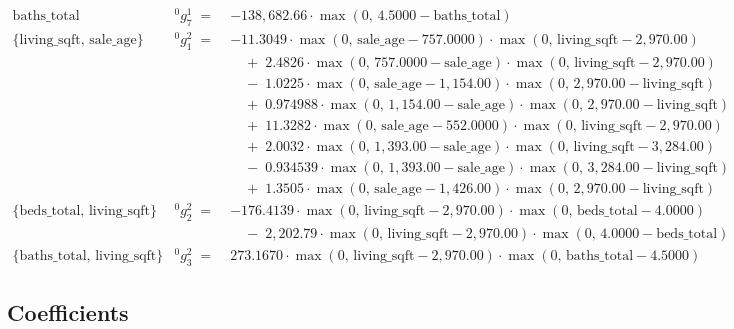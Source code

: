 \documentclass[
]{article}
\begin{document}
\[\begin{array}{lrl}
  \text{baths\_total} & {}^{0}g^{1}_{7} \;=\; & -138,682.66 \cdot \max(0,\, 4.5000 - \text{baths\_total}) \\
  \{\text{living\_sqft},\, \text{sale\_age}\} & {}^{0}g^{2}_{1} \;=\; & -11.3049 \cdot \max(0,\, \text{sale\_age} - 757.0000) \cdot \max(0,\, \text{living\_sqft} - 2,970.00) \\
  & & \quad + \; 2.4826 \cdot \max(0,\, 757.0000 - \text{sale\_age}) \cdot \max(0,\, \text{living\_sqft} - 2,970.00) \\
  & & \quad - \; 1.0225 \cdot \max(0,\, \text{sale\_age} - 1,154.00) \cdot \max(0,\, 2,970.00 - \text{living\_sqft}) \\
  & & \quad + \; 0.974988 \cdot \max(0,\, 1,154.00 - \text{sale\_age}) \cdot \max(0,\, 2,970.00 - \text{living\_sqft}) \\
  & & \quad + \; 11.3282 \cdot \max(0,\, \text{sale\_age} - 552.0000) \cdot \max(0,\, \text{living\_sqft} - 2,970.00) \\
  & & \quad + \; 2.0032 \cdot \max(0,\, 1,393.00 - \text{sale\_age}) \cdot \max(0,\, \text{living\_sqft} - 3,284.00) \\
  & & \quad - \; 0.934539 \cdot \max(0,\, 1,393.00 - \text{sale\_age}) \cdot \max(0,\, 3,284.00 - \text{living\_sqft}) \\
  & & \quad + \; 1.3505 \cdot \max(0,\, \text{sale\_age} - 1,426.00) \cdot \max(0,\, 2,970.00 - \text{living\_sqft}) \\
  \{\text{beds\_total},\, \text{living\_sqft}\} & {}^{0}g^{2}_{2} \;=\; & -176.4139 \cdot \max(0,\, \text{living\_sqft} - 2,970.00) \cdot \max(0,\, \text{beds\_total} - 4.0000) \\
  & & \quad - \; 2,202.79 \cdot \max(0,\, \text{living\_sqft} - 2,970.00) \cdot \max(0,\, 4.0000 - \text{beds\_total}) \\
  \{\text{baths\_total},\, \text{living\_sqft}\} & {}^{0}g^{2}_{3} \;=\; & 273.1670 \cdot \max(0,\, \text{living\_sqft} - 2,970.00) \cdot \max(0,\, \text{baths\_total} - 4.5000)
\end{array} 
\]

\subsection{Coefficients}\label{coefficients}
\end{document}
